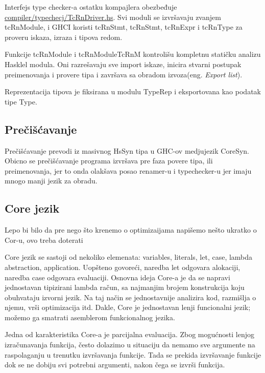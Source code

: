Interfejs type checker-a ostatku kompajlera obezbeđuje \\ \underline{compiler/typechecj/TcRnDriver.hs}. Svi moduli se izvršavaju zvanjem tcRnModule, i GHCI koristi tcRnStmt, tcRnStmt, tcRnExpr 
i tcRnType za proveru iskaza, izraza i tipova redom.

Funkcije tcRnModule i tcRnModuleTcRnM kontrolišu kompletnu statičku analizu Hasklel modula. Oni razrešavaju sve import iskaze, inicira stvarni postupak preimenovanja i provere tipa i završava sa obradom izvoza(eng. \emph{Export list}).

Reprezentacija tipova je fiksirana u modulu TypeRep i eksportovana kao podatak tipe Type.

\subsection{Prečišćavanje}
\label{subsec:podnaslovDesugar}

Prečišćavanje prevodi iz masivnog HsSyn tipa u GHC-ov medjujezik CoreSyn. Obicno se prečišćavanje programa izvršava pre faza povere tipa, ili preimenovanja, jer to onda olakšava posao renamer-u i typechecker-u jer imaju mnogo manji jezik za obradu.

\subsection{Core jezik}
\label{subsec:podnaslovCore}

Lepo bi bilo da pre nego što krenemo o optimizaijama napišemo nešto ukratko o Cor-u, ovo treba doterati

Core jezik se sastoji od nekoliko elemenata: variables, literals, let, case, lambda abstraction, application. 
Uopšteno govoreći, naredba let odgovara alokaciji, naredba case odgovara evaluaciji.
Osnovna ideja Core-a je da se napravi jednostavan tipizirani lambda račun, sa najmanjim brojem konstrukcija koju obuhvataju izvorni jezik. Na taj način se jednostavnije analizira kod, razmišlja o njemu, vrši optimizacija itd.
Dakle, Core je jednostavan lenji funcionalni jezik; možemo ga smatrati asemblerom funkcionalnog jezika.

Jedna od karakteristika Core-a je parcijalna evaluacija. Zbog mogućnosti lenjog izračunavanja funkcija, često dolazimo u situaciju da nemamo sve argumente na raspolaganju u trenutku izvršavanja funkcije. Tada se prekida izvršavanje funkcije dok se ne dobiju svi potrebni argumenti, nakon čega se izvrši funkcija. 
